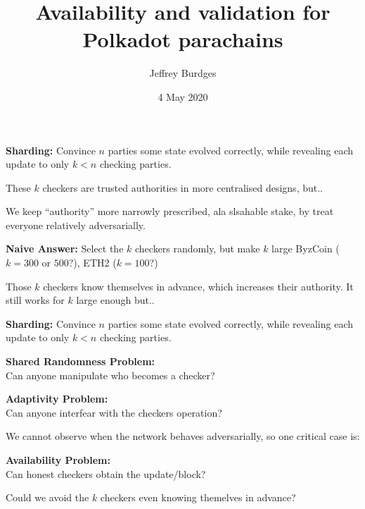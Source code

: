 \documentclass{beamer}
\title[A\&V]{Availability and validation for Polkadot parachains}
\author[Burdges]{Jeffrey Burdges}
\institute[W3F]{
 Web 3 Foundation
}
\date{\small 4 May 2020} %
\begin{document}
\begin{frame}
\titlepage
\end{frame}


\begin{frame}[t]

{\bf Sharding:}  Convince $n$ parties some state evolved correctly, while revealing each update to only $k<n$ checking parties.

\bigskip\bigskip
These $k$ checkers are trusted authorities in more centralised designs, but..

\medskip

We keep ``authority'' more narrowly prescribed, ala slsahable stake,
by treat everyone relatively adversarially. 

\pause
\bigskip\bigskip

{\bf Naive Answer:}   
Select the $k$ checkers randomly, but make $k$ large
\hspace*{3pt} ByzCoin ($k=300$ or $500$?), ETH2 ($k=100$?)

\medskip

Those $k$ checkers know themselves in advance, which increases their authority.
It still works for $k$ large enough but..

\end{frame}


\begin{frame}[t]

{\bf Sharding:}  Convince $n$ parties some state evolved correctly, while revealing each update to only $k<n$ checking parties.

\bigskip\bigskip

{\bf Shared Randomness Problem:}  \\
Can anyone manipulate who becomes a checker?

\bigskip\bigskip

{\bf Adaptivity Problem:}  \\
Can anyone interfear with the checkers operation?

\bigskip
We cannot observe when the network behaves adversarially, so one critical case is:

{\bf Availability Problem:}  \\
Can honest checkers obtain the update/block?  

\pause
\bigskip\bigskip

Could we avoid the $k$ checkers even knowing themelves in advance? 

\end{frame}
\end{document}
